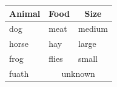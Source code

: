 \documentclass{article}
\begin{document}
	\begin{tabular}{lll}
		\toprule
		\multicolumn{1}{c}{Animal} & \multicolumn{1}{c}{Food}  & \multicolumn{1}{c}{Size} \\
		\midrule
		dog    & meat  & medium \\
		horse  & hay   & large  \\
		frog   & flies & small  \\
		fuath & \multicolumn{2}{c}{unknown} \\
		\bottomrule
	\end{tabular}
\end{document}
